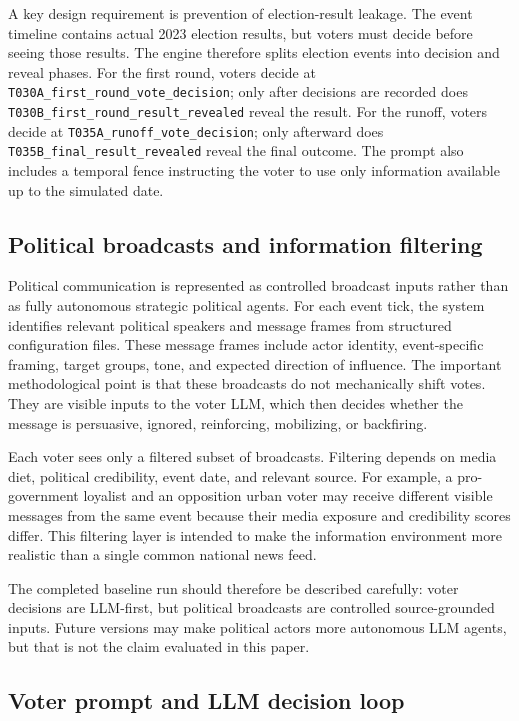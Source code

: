 \documentclass[pdflatex,sn-mathphys-num,iicol]{sn-jnl}
\begin{document}
A key design requirement is prevention of election-result leakage. The event timeline contains actual 2023 election results, but voters must decide before seeing those results. The engine therefore splits election events into decision and reveal phases. For the first round, voters decide at \texttt{T030A\_first\_round\_vote\_decision}; only after decisions are recorded does \texttt{T030B\_first\_round\_result\_revealed} reveal the result. For the runoff, voters decide at \texttt{T035A\_runoff\_vote\_decision}; only afterward does \texttt{T035B\_final\_result\_revealed} reveal the final outcome. The prompt also includes a temporal fence instructing the voter to use only information available up to the simulated date.

\subsection{Political broadcasts and information filtering}\label{subsec:broadcasts}

Political communication is represented as controlled broadcast inputs rather than as fully autonomous strategic political agents. For each event tick, the system identifies relevant political speakers and message frames from structured configuration files. These message frames include actor identity, event-specific framing, target groups, tone, and expected direction of influence. The important methodological point is that these broadcasts do not mechanically shift votes. They are visible inputs to the voter LLM, which then decides whether the message is persuasive, ignored, reinforcing, mobilizing, or backfiring.

Each voter sees only a filtered subset of broadcasts. Filtering depends on media diet, political credibility, event date, and relevant source. For example, a pro-government loyalist and an opposition urban voter may receive different visible messages from the same event because their media exposure and credibility scores differ. This filtering layer is intended to make the information environment more realistic than a single common national news feed.

The completed baseline run should therefore be described carefully: voter decisions are LLM-first, but political broadcasts are controlled source-grounded inputs. Future versions may make political actors more autonomous LLM agents, but that is not the claim evaluated in this paper.

\subsection{Voter prompt and LLM decision loop}\label{subsec:prompt}
\end{document}
